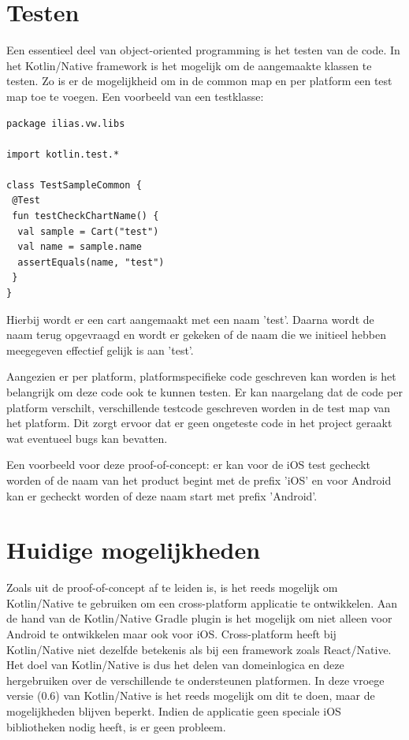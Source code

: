 \section{Testen}
\label{sec:testing}
Een essentieel deel van object-oriented programming is het testen van de code. In het Kotlin/Native framework is het mogelijk om de aangemaakte klassen te testen. Zo is er de mogelijkheid om in de common map en per platform een test map toe te voegen. Een voorbeeld van een testklasse:

\begin{lstlisting}
package ilias.vw.libs

import kotlin.test.*

class TestSampleCommon {
 @Test
 fun testCheckChartName() {
  val sample = Cart("test")
  val name = sample.name
  assertEquals(name, "test")
 }
}

\end{lstlisting}

Hierbij wordt er een cart aangemaakt met een naam 'test'. Daarna wordt de naam terug opgevraagd en wordt er gekeken of de naam die we initieel hebben meegegeven effectief gelijk is aan 'test'.

Aangezien er per platform, platformspecifieke code geschreven kan worden is het belangrijk om deze code ook te kunnen testen. Er kan naargelang dat de code per platform verschilt, verschillende testcode geschreven worden in de test map van het platform. Dit zorgt ervoor dat er geen ongeteste code in het project geraakt wat eventueel bugs kan bevatten. 

Een voorbeeld voor deze proof-of-concept: er kan voor de iOS test gecheckt worden of de naam van het product begint met de prefix 'iOS' en voor Android kan er gecheckt worden of deze naam start met prefix 'Android'.

\section{Huidige mogelijkheden}
Zoals uit de proof-of-concept af te leiden is, is het reeds mogelijk om Kotlin/Native te gebruiken om een cross-platform applicatie te ontwikkelen. Aan de hand van de Kotlin/Native Gradle plugin is het mogelijk om niet alleen voor Android te ontwikkelen maar ook voor iOS. Cross-platform heeft bij Kotlin/Native niet dezelfde betekenis als bij een framework zoals React/Native. Het doel van Kotlin/Native is dus het delen van domeinlogica en deze hergebruiken over de verschillende te ondersteunen platformen. In deze vroege versie (0.6) van Kotlin/Native is het reeds mogelijk om dit te doen, maar de mogelijkheden blijven beperkt. Indien de applicatie geen speciale iOS bibliotheken nodig heeft, is er geen probleem.

